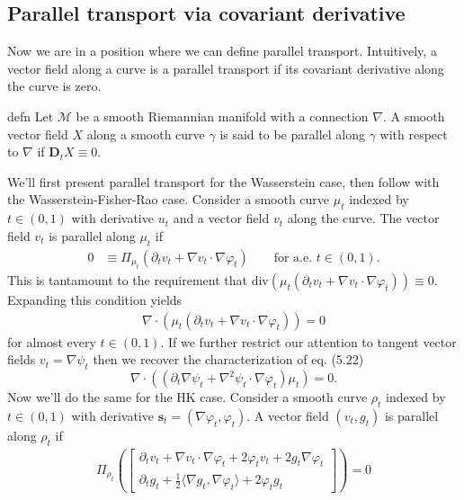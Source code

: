 \documentclass{article}
\newcommand{\man}{\mathcal{M}}
\begin{document}
\subsection{Parallel transport via covariant derivative}

Now we are in a position where we can define parallel transport. Intuitively, a vector field along a curve is a parallel transport if its covariant derivative along the curve is zero.
\begin{restatable}{defn}{}
    Let $\man$ be a smooth Riemannian manifold with a connection $\nabla$. A smooth vector field $X$ along a smooth curve $\gamma$ is said to be parallel along $\gamma$ with respect to $\nabla$ if $\mathbf{D}_tX \equiv 0$.
\end{restatable}
We'll first present parallel transport for the Wasserstein case, then follow with the Wasserstein-Fisher-Rao case. Consider a smooth curve $\mu_t$ indexed by $t \in (0, 1)$ with derivative $u_t$ and a vector field $v_t$ along the curve. The vector field $v_t$ is parallel along $\mu_t$ if
\begin{align}
    0 &\equiv \Pi_{\mu_t}\left(\partial_tv_t + \nabla v_t \cdot \nabla\varphi_t\right) \qquad \text{for a.e. }t \in(0,1).
\end{align}
This is tantamount to the requirement that $\text{div}\left(\mu_t\left(\partial_tv_t + \nabla v_t \cdot \nabla \varphi_t\right)\right) \equiv 0$.  Expanding this condition yields
\begin{align}
    \nabla \cdot \left(\mu_t(\partial_tv_t + \nabla v_t \cdot \nabla\varphi_t)\right)  = 0
\end{align}
for almost every $t \in (0,1)$. If we further restrict our attention to tangent vector fields $v_t = \nabla \psi_t$ then we recover the characterization of \citet{ambrosio2008construction} eq. (5.22) 
\begin{equation}
    \nabla \cdot \left((\partial_t\nabla \psi_t + \nabla^2\psi_t\cdot \nabla \varphi_t)\mu_t\right) = 0.
\end{equation}
Now we'll do the same for the HK case. Consider a smooth curve $\rho_t$ indexed by $t \in (0,1)$ with derivative $\mathbf{s}_t = (\nabla\varphi_t, \varphi_t)$. A vector field $(v_t, g_t)$ is parallel along $\rho_t$ if
\begin{align}
    \Pi_{\rho_t}\left(\begin{bmatrix}
        \partial_tv_t + \nabla v_t\cdot \nabla\varphi_t + 2\varphi_tv_t +  2g_t\nabla\varphi_t \\
        \partial_tg_t + \frac{1}{2}\langle\nabla g_t, \nabla\varphi_t\rangle + 2\varphi_t g_t
    \end{bmatrix}\right) = 0
\end{align}
\end{document}
